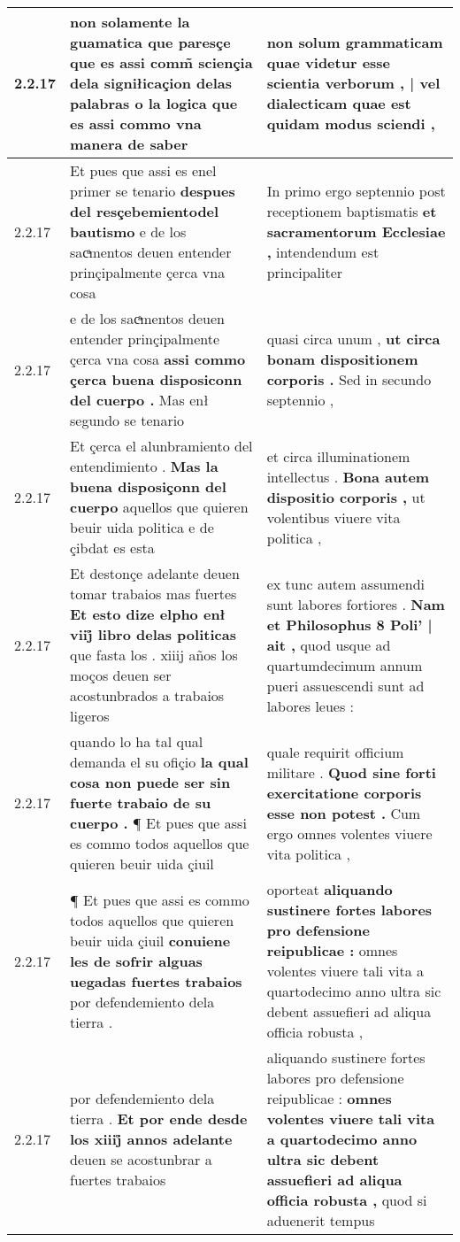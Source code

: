 \begin{tabular}{|p{1cm}|p{6.5cm}|p{6.5cm}|}
2.2.17 & non solamente la guamatica que paresçe \textbf{ que es assi comm̃ sciençia dela signiłicaçion delas palabras o la logica } que es assi commo vna manera de saber & non solum grammaticam \textbf{ quae videtur esse scientia verborum , | vel dialecticam } quae est quidam modus sciendi , \\\hline
2.2.17 & Et pues que assi es enel primer se tenario \textbf{ despues del resçebemientodel bautismo } e de los sacͣmentos deuen entender prinçipalmente çerca vna cosa & In primo ergo septennio post receptionem baptismatis \textbf{ et sacramentorum Ecclesiae , } intendendum est principaliter \\\hline
2.2.17 & e de los sacͣmentos deuen entender prinçipalmente çerca vna cosa \textbf{ assi commo çerca buena disposiconn del cuerpo . } Mas enł segundo se tenario & quasi circa unum , \textbf{ ut circa bonam dispositionem corporis . } Sed in secundo septennio , \\\hline
2.2.17 & Et çerca el alunbramiento del entendimiento . \textbf{ Mas la buena disposiçonn del cuerpo } aquellos que quieren beuir uida politica e de çibdat es esta & et circa illuminationem intellectus . \textbf{ Bona autem dispositio corporis , } ut volentibus viuere vita politica , \\\hline
2.2.17 & Et destonçe adelante deuen tomar trabaios mas fuertes \textbf{ Et esto dize elpho enł viij̊ libro delas politicas } que fasta los . xiiij años los moços deuen ser acostunbrados a trabaios ligeros & ex tunc autem assumendi sunt labores fortiores . \textbf{ Nam et Philosophus 8 Poli’ | ait , } quod usque ad quartumdecimum annum pueri assuescendi sunt ad labores leues : \\\hline
2.2.17 & quando lo ha tal qual demanda el su ofiçio \textbf{ la qual cosa non puede ser sin fuerte trabaio de su cuerpo . } ¶ Et pues que assi es commo todos aquellos que quieren beuir uida çiuil & quale requirit officium militare . \textbf{ Quod sine forti exercitatione corporis esse non potest . } Cum ergo omnes volentes viuere vita politica , \\\hline
2.2.17 & ¶ Et pues que assi es commo todos aquellos que quieren beuir uida çiuil \textbf{ conuiene les de sofrir alguas uegadas fuertes trabaios } por defendemiento dela tierra . & oporteat \textbf{ aliquando sustinere fortes labores pro defensione reipublicae : } omnes volentes viuere tali vita a quartodecimo anno ultra sic debent assuefieri ad aliqua officia robusta , \\\hline
2.2.17 & por defendemiento dela tierra . \textbf{ Et por ende desde los xiiij̊ annos adelante } deuen se acostunbrar a fuertes trabaios & aliquando sustinere fortes labores pro defensione reipublicae : \textbf{ omnes volentes viuere tali vita a quartodecimo anno ultra sic debent assuefieri ad aliqua officia robusta , } quod si aduenerit tempus \\\hline

\end{tabular}
